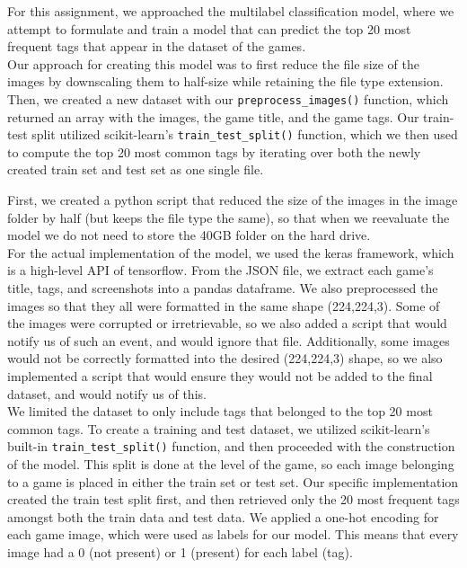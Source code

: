 \documentclass{article}
\begin{document}
For this assignment, we approached the multilabel classification model, where we attempt to formulate and train a model that can predict the top 20 most frequent tags that appear in the dataset of the games. \\

Our approach for creating this model was to first reduce the file size of the images by downscaling them to half-size while retaining the file type extension. Then, we created a new dataset with our \verb|preprocess_images()| function, which returned an array with the images, the game title, and the game tags. Our train-test split utilized scikit-learn's \verb|train_test_split()| function, which we then used to compute the top 20 most common tags by iterating over both the newly created train set and test set as one single file. 

First, we created a python script that reduced the size of the images in the image folder by half (but keeps the file type the same), so that when we reevaluate the model we do not need to store the 40GB folder on the hard drive. 
\\
For the actual implementation of the model, we used the keras framework, which is a high-level API of tensorflow. From the JSON file, we extract each game's title, tags, and screenshots into a pandas dataframe. We also preprocessed the images so that they all were formatted in the same shape (224,224,3). Some of the images were corrupted or irretrievable, so we also added a script that would notify us of such an event, and would ignore that file. Additionally, some images would not be correctly formatted into the desired (224,224,3) shape, so we also implemented a script that would ensure they would not be added to the final dataset, and would notify us of this. \\

We limited the dataset to only include tags that belonged to the top 20 most common tags. To create a training and test dataset, we utilized scikit-learn's built-in \verb|train_test_split()| function, and then proceeded with the construction of the model. This split is done at the level of the game, so each image belonging to a game is placed in either the train set or test set. Our specific implementation created the train test split first, and then retrieved only the 20 most frequent tags amongst both the train data and test data. We applied a one-hot encoding for each game image, which were used as labels for our model. This means that every image had a 0 (not present) or 1 (present) for each label (tag). \\
\end{document}
